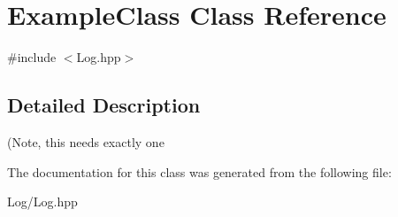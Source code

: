 \hypertarget{classExampleClass}{}\section{Example\+Class Class Reference}
\label{classExampleClass}


{\ttfamily \#include $<$Log.\+hpp$>$}



\subsection{Detailed Description}
(Note, this needs exactly one 

The documentation for this class was generated from the following file\+:\begin{DoxyCompactItemize}
\item 
Log/Log.\+hpp\end{DoxyCompactItemize}
